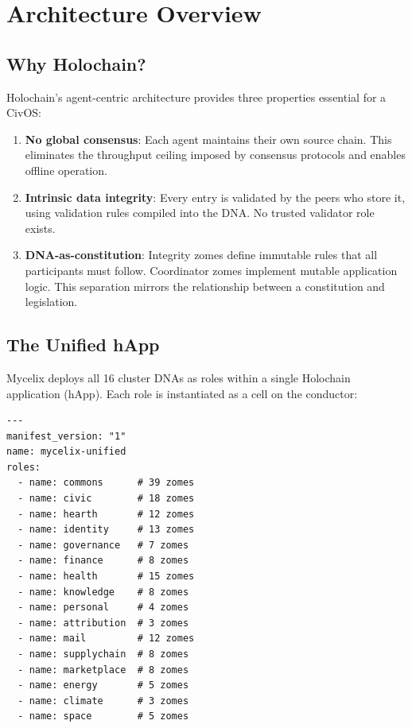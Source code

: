 \documentclass[11pt,twocolumn]{article}
\begin{document}
\section{Architecture Overview}

\subsection{Why Holochain?}

Holochain's agent-centric architecture provides three properties essential for
a CivOS:

\begin{enumerate}[nosep]
  \item \textbf{No global consensus}: Each agent maintains their own source chain.
    This eliminates the throughput ceiling imposed by consensus protocols and
    enables offline operation.
  \item \textbf{Intrinsic data integrity}: Every entry is validated by the peers
    who store it, using validation rules compiled into the DNA. No trusted
    validator role exists.
  \item \textbf{DNA-as-constitution}: Integrity zomes define immutable rules
    that all participants must follow. Coordinator zomes implement mutable
    application logic. This separation mirrors the relationship between a
    constitution and legislation.
\end{enumerate}

\subsection{The Unified hApp}

Mycelix deploys all 16 cluster DNAs as roles within a single Holochain
application (hApp). Each role is instantiated as a cell on the conductor:

\begin{lstlisting}[language={}]
---
manifest_version: "1"
name: mycelix-unified
roles:
  - name: commons      # 39 zomes
  - name: civic        # 18 zomes
  - name: hearth       # 12 zomes
  - name: identity     # 13 zomes
  - name: governance   # 7 zomes
  - name: finance      # 8 zomes
  - name: health       # 15 zomes
  - name: knowledge    # 8 zomes
  - name: personal     # 4 zomes
  - name: attribution  # 3 zomes
  - name: mail         # 12 zomes
  - name: supplychain  # 8 zomes
  - name: marketplace  # 8 zomes
  - name: energy       # 5 zomes
  - name: climate      # 3 zomes
  - name: space        # 5 zomes
\end{lstlisting}
\end{document}

